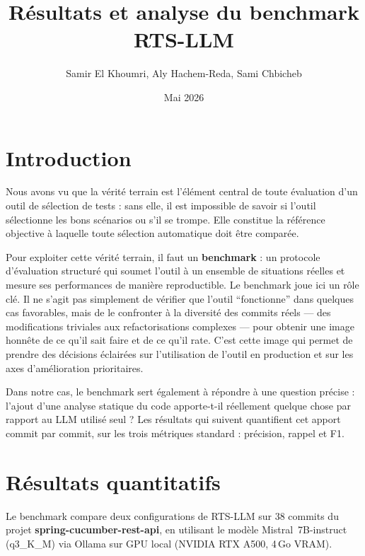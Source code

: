 \documentclass[12pt,a4paper]{article}
\title{\textbf{Résultats et analyse du benchmark RTS-LLM}}
\author{Samir El Khoumri, Aly Hachem-Reda, Sami Chbicheb}
\date{Mai 2026}
\begin{document}
\maketitle
\tableofcontents
\newpage

\section{Introduction}

Nous avons vu que la vérité terrain est l'élément central de toute évaluation
d'un outil de sélection de tests : sans elle, il est impossible de savoir si
l'outil sélectionne les bons scénarios ou s'il se trompe. Elle constitue la
référence objective à laquelle toute sélection automatique doit être comparée.

Pour exploiter cette vérité terrain, il faut un \textbf{benchmark} : un
protocole d'évaluation structuré qui soumet l'outil à un ensemble de situations
réelles et mesure ses performances de manière reproductible. Le benchmark joue
ici un rôle clé. Il ne s'agit pas simplement de vérifier que l'outil
``fonctionne'' dans quelques cas favorables, mais de le confronter à la
diversité des commits réels --- des modifications triviales aux refactorisations
complexes --- pour obtenir une image honnête de ce qu'il sait faire et de ce
qu'il rate. C'est cette image qui permet de prendre des décisions éclairées sur
l'utilisation de l'outil en production et sur les axes d'amélioration prioritaires.

Dans notre cas, le benchmark sert également à répondre à une question précise :
l'ajout d'une analyse statique du code apporte-t-il réellement quelque chose par
rapport au LLM utilisé seul ? Les résultats qui suivent quantifient cet apport
commit par commit, sur les trois métriques standard : précision, rappel et F1.

\section{Résultats quantitatifs}

Le benchmark compare deux configurations de RTS-LLM sur 38 commits du projet
\textbf{spring-cucumber-rest-api}, en utilisant le modèle Mistral~7B-instruct
(q3\_K\_M) via Ollama sur GPU local (NVIDIA RTX A500, 4\,Go VRAM).
\end{document}

